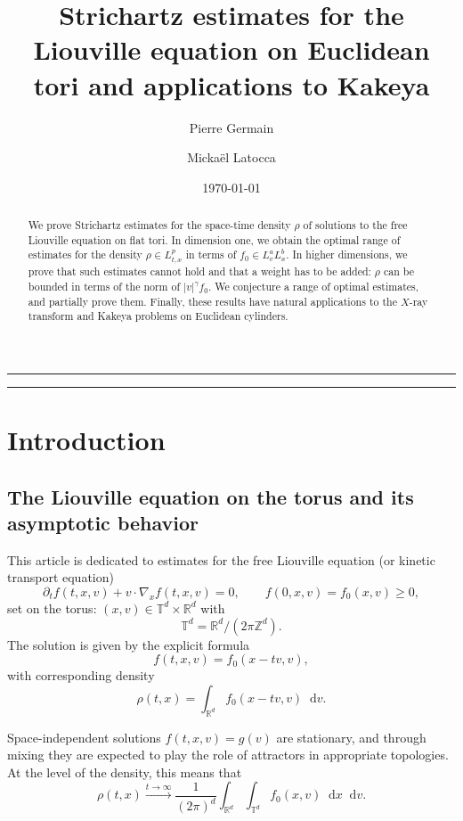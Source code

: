 \documentclass[11pt,a4paper,reqno]{amsart}
\author{Pierre Germain}
\author{Micka\"el Latocca}
\title[Periodic Liouville Strichartz estimates]{Strichartz estimates for the Liouville equation on Euclidean tori and applications to Kakeya}
\date{\today}
\theoremstyle{plain}
\theoremstyle{remark}
\newcommand{\dd}{\mathop{}\!\mathrm{d}}
\begin{document}
\begin{abstract}
We prove Strichartz estimates for the space-time density $\rho$ of solutions to the free Liouville equation on flat tori. In dimension one, we obtain the optimal range of estimates for the density $\rho \in L^p_{t,x}$ in terms of $f_0 \in L^{a}_vL^{b}_x$. In higher dimensions, we prove that such estimates cannot hold and that a weight has to be added: $\rho$ can be bounded in terms of the norm of $|v|^\gamma f_0$. We conjecture a range of optimal estimates, and partially prove them. Finally, these results have natural applications to the $X$-ray transform and Kakeya problems on Euclidean cylinders.
\end{abstract}

\hrule
\vspace{0.5cm}
\maketitle
\hrule 
\vspace{0.4cm}

\section{Introduction}

\subsection{The Liouville equation on the torus and its asymptotic behavior}

This article is dedicated to estimates for the free Liouville equation (or kinetic transport equation)
\begin{equation}\label{eq:Liouville}
    \partial_t f(t,x,v) + v\cdot\nabla_x f(t,x,v) = 0,\qquad f(0,x,v)=f_0(x,v) \geq 0, 
\end{equation}
set on the torus: $(x,v) \in \mathbb{T}^d \times \mathbb{R}^d$ with
\[
    \mathbb{T}^d = \mathbb{R}^d / (2\pi \mathbb{Z}^d).
\]
The solution is given by the explicit formula
\[
    f(t,x,v)=f_0(x-tv,v), 
\]
with corresponding density 
\[
    \rho(t,x)=\int_{\mathbb{R}^d} f_0(x-tv,v)\dd v.
\]

Space-independent solutions $f(t,x,v) = g(v)$ are stationary, and through mixing they are expected to play the role of attractors in appropriate topologies. At the level of the density, this means that 
\[
    \rho(t,x) \overset{t\to \infty}{\longrightarrow} \frac{1}{(2\pi)^d}\int_{\mathbb{R}^d} \int_{\mathbb{T}^d} f_0(x,v) \dd x \dd v.
\]
\end{document}
